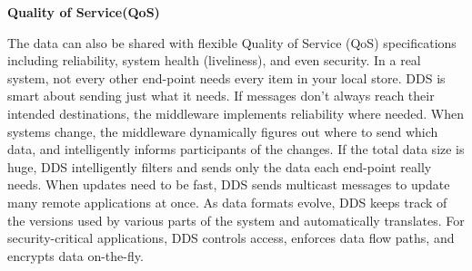 \documentclass[%
xelatex,
	oneside,		%
	12pt,			%
	parskip=half,	%
	abstracton,
	chapterprefix=true%
    appendixprefix=true]
{scrbook}
\begin{document}
\vspace*{0.2cm}
	
	{\bfseries Quality of Service(QoS)}
	
	
	\vspace*{0.5cm}
	The data can also be shared with flexible Quality of Service (QoS) specifications including reliability, system health (liveliness), and even security. In a real system, not every other end-point needs every item in your local store. DDS is smart about sending just what it needs. If messages don’t always reach their intended destinations, the middleware implements reliability where needed. When systems change, the middleware dynamically figures out where to send which data, and intelligently informs participants of the changes. If the total data size is huge, DDS intelligently filters and sends only the data each end-point really needs. When updates need to be fast, DDS sends multicast messages to update many remote applications at once. As data formats evolve, DDS keeps track of the versions used by various parts of the system and automatically translates. For security-critical applications, DDS controls access, enforces data flow paths, and encrypts data on-the-fly.\cite{DDS}
	
\vspace*{0.2cm}
	
\end{document}

